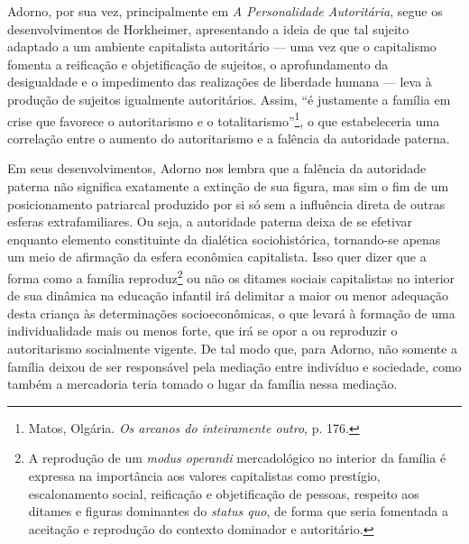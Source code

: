 Adorno, por sua vez, principalmente em \emph{A Personalidade
Autoritária}, segue os desenvolvimentos de Horkheimer, apresentando a
ideia de que tal sujeito adaptado a um ambiente capitalista autoritário
--- uma vez que o capitalismo fomenta a reificação e objetificação de
sujeitos, o aprofundamento da desigualdade e o impedimento das
realizações de liberdade humana --- leva à produção de sujeitos
igualmente autoritários. Assim, ``é justamente a família em crise que
favorece o autoritarismo e o totalitarismo''\footnote{Matos, Olgária.
  \emph{Os arcanos do inteiramente outro}, p. 176.}, o que estabeleceria
uma correlação entre o aumento do autoritarismo e a falência da
autoridade paterna.

Em seus desenvolvimentos, Adorno nos lembra que a falência da autoridade
paterna não significa exatamente a extinção de sua figura, mas sim o fim
de um posicionamento patriarcal produzido por si só sem a influência
direta de outras esferas extrafamiliares. Ou seja, a autoridade paterna
deixa de se efetivar enquanto elemento constituinte da dialética
sociohistórica, tornando-se apenas um meio de afirmação da esfera
econômica capitalista. Isso quer dizer que a forma como a família
reproduz\footnote{A reprodução de um \emph{modus operandi} mercadológico
  no interior da família é expressa na importância aos valores
  capitalistas como prestígio, escalonamento social, reificação e
  objetificação de pessoas, respeito aos ditames e figuras dominantes do
  \emph{status quo}, de forma que seria fomentada a aceitação e
  reprodução do contexto dominador e autoritário.} ou não os ditames
sociais capitalistas no interior de sua dinâmica na educação infantil
irá delimitar a maior ou menor adequação desta criança às determinações
socioeconômicas, o que levará à formação de uma individualidade mais ou
menos forte, que irá se opor a ou reproduzir o autoritarismo socialmente
vigente. De tal modo que, para Adorno, não somente a família deixou de
ser responsável pela mediação entre indivíduo e sociedade, como também a
mercadoria teria tomado o lugar da família nessa mediação.

